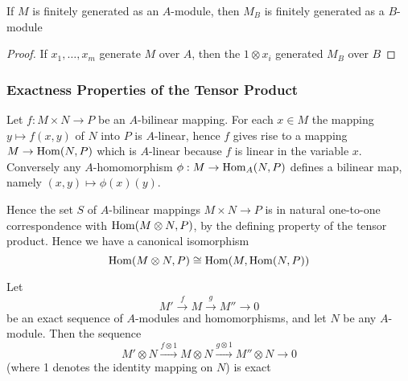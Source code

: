 \documentclass[11pt]{article}
\begin{document}
\begin{proposition}[]
\label{2.17}
If \(M\) is finitely generated as an \(A\)-module, then \(M_B\) is finitely generated as a \(B\)-module
\end{proposition}

\begin{proof}
If \(x_1,\dots,x_m\) generate \(M\) over \(A\), then the \(1\otimes x_i\) generated \(M_B\) over \(B\)
\end{proof}
\subsubsection*{Exactness Properties of the Tensor Product}
\label{sec:org41289e4}
Let \(f:M\times N\to P\) be an \(A\)-bilinear mapping. For each \(x\in M\) the mapping \(y\mapsto f(x,y)\)
of \(N\) into \(P\) is \(A\)-linear, hence \(f\) gives rise to a mapping \(M\to\operatorname{Hom}(N,P)\) which
is \(A\)-linear because \(f\) is linear in the variable \(x\). Conversely
any \(A\)-homomorphism \(\phi:M\to\operatorname{Hom}_A(N,P)\) defines a bilinear map, namely \((x,y)\mapsto\phi(x)(y)\).

Hence the set \(S\) of \(A\)-bilinear mappings \(M\times N\to P\) is in natural one-to-one
correspondence with \(\operatorname{Hom}(M\otimes N,P)\), by the defining property of the tensor product. Hence we
have a canonical isomorphism
\begin{equation}
\operatorname{Hom}(M\otimes N,P)\cong\operatorname{Hom}(M,\operatorname{Hom}(N,P))\label{eq28}
\end{equation}

\begin{proposition}[]
\label{2.18}
Let
\begin{equation*}
M'\xrightarrow{f}M\xrightarrow{g}M''\to 0\tag*{(\star)}
\end{equation*}
be an exact sequence of \(A\)-modules and homomorphisms, and let \(N\) be any \(A\)-module. Then
the sequence
\begin{equation*}
M'\otimes N\xrightarrow{f\otimes 1}M\otimes N\xrightarrow{g\otimes 1}M''\otimes N\to 0\tag*{(\star\star)}
\end{equation*}
(where 1 denotes the identity mapping on \(N\)) is exact
\end{proposition}
\end{document}
